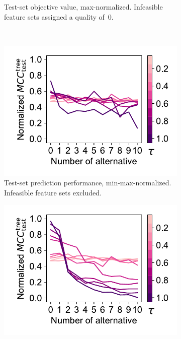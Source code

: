 \documentclass{article}
\theoremstyle{definition}
\begin{document}
\begin{figure}[p]
\begin{subfigure}[t]{0.48\textwidth}
		\caption{
			Test-set objective value, max-norma\-lized.
			Infeasible feature sets assigned a quality of~0.
		}
		\label{fig:afs:impact-num-alternatives-tau-test-objective-max-fillna}
	\end{subfigure}
	\\ \vspace{\baselineskip}
	\begin{subfigure}[t]{0.48\textwidth}
		\centering
		\includegraphics[width=\textwidth, trim=15 17 10 15, clip]{plots/afs-impact-num-alternatives-tau-decision-tree-test-mcc-min-max.pdf}
		\caption{
			Test-set prediction performance, min-max-normalized.
			Infeasible feature sets excluded.
		}
		\label{fig:afs:impact-num-alternatives-tau-decision-tree-test-mcc-min-max}
	\end{subfigure}
	\hfill
	\begin{subfigure}[t]{0.48\textwidth}
		\centering
		\includegraphics[width=\textwidth, trim=15 17 10 15, clip]{plots/afs-impact-num-alternatives-tau-decision-tree-test-mcc-min-max-fillna.pdf}

\end{subfigure}
\end{figure}
\end{document}
